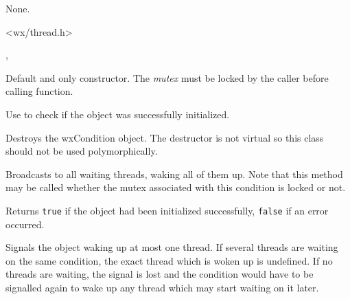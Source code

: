 
None.


<wx/thread.h>




, 


\label{wxconditionctor}


Default and only constructor. The {\it mutex} must be locked by the caller
before calling  function.

Use  to check if the object was successfully
initialized.

\label{wxconditiondtor}


Destroys the wxCondition object. The destructor is not virtual so this class
should not be used polymorphically.

\label{wxconditionbroadcast}


Broadcasts to all waiting threads, waking all of them up. Note that this method
may be called whether the mutex associated with this condition is locked or
not.



\label{wxconditionisok}


Returns {\tt true} if the object had been initialized successfully, {\tt false} 
if an error occurred.

\label{wxconditionsignal}


Signals the object waking up at most one thread. If several threads are waiting
on the same condition, the exact thread which is woken up is undefined. If no
threads are waiting, the signal is lost and the condition would have to be
signalled again to wake up any thread which may start waiting on it later.

